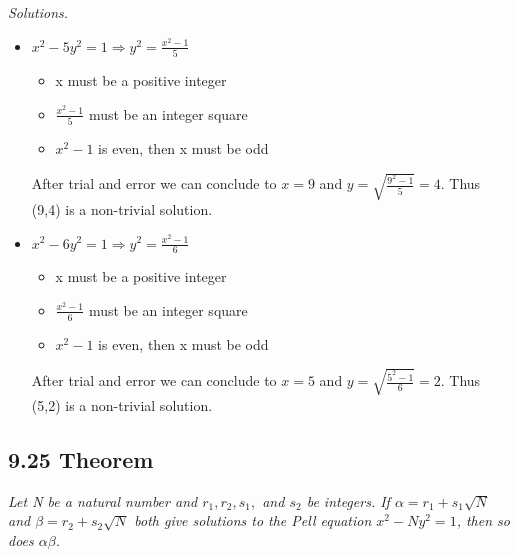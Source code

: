 \documentclass{article}
\begin{document}
\textit{Solutions.}
\begin{itemize}
    \item $x^2 - 5y^2 = 1 \Longrightarrow y^2 = \frac{x^2-1}{5}$
    \begin{itemize}
        \item x must be a positive integer
        \item $\frac{x^2-1}{5}$ must be an integer square
        \item $x^2-1$ is even, then x must be odd
    \end{itemize}
    After trial and error we can conclude to $x = 9$ and $y = \sqrt{\frac{9^2-1}{5}} = 4$. Thus (9,4) is a non-trivial solution. 
    \item $x^2 - 6y^2 = 1 \Longrightarrow y^2 = \frac{x^2-1}{6}$
    \begin{itemize}
        \item x must be a positive integer
        \item $\frac{x^2-1}{6}$ must be an integer square
        \item $x^2-1$ is even, then x must be odd
    \end{itemize}
    After trial and error we can conclude to $x = 5$ and $y = \sqrt{\frac{5^2-1}{6}} = 2$. Thus (5,2) is a non-trivial solution. 
\end{itemize}

\subsection*{9.25 Theorem} 
\quad \textit{Let N be a natural number and $r_1, r_2, s_1,$ and $s_2$ be integers. If $\alpha = r_1 + s_1\sqrt{N}$ and $\beta = r_2 + s_2\sqrt{N}$ both give solutions to the Pell equation $x^2 - Ny^2 = 1$, then so does $\alpha \beta$.}
\end{document}
